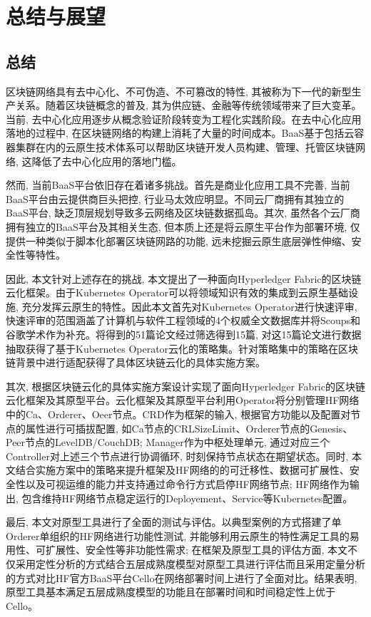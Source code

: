 \chapter{总结与展望}

\section{总结}

区块链网络具有去中心化、不可伪造、不可篡改的特性, 其被称为下一代的新型生产关系。随着区块链概念的普及, 其为供应链、金融等传统领域带来了巨大变革。当前, 去中心化应用逐步从概念验证阶段转变为工程化实践阶段。在去中心化应用落地的过程中, 在区块链网络的构建上消耗了大量的时间成本。BaaS基于包括云容器集群在内的云原生技术体系可以帮助区块链开发人员构建、管理、托管区块链网络, 这降低了去中心化应用的落地门槛。

然而, 当前BaaS平台依旧存在着诸多挑战。首先是商业化应用工具不完善, 当前BaaS平台由云提供商巨头把控, 行业马太效应明显。不同云厂商拥有其独立的BaaS平台, 缺乏顶层规划导致多云网络及区块链数据孤岛。其次, 虽然各个云厂商拥有独立的BaaS平台及其相关生态, 但本质上还是将云原生平台作为部署环境, 仅提供一种类似于脚本化部署区块链网路的功能, 远未挖掘云原生底层弹性伸缩、安全性等特性。

因此, 本文针对上述存在的挑战, 本文提出了一种面向Hyperledger Fabric的区块链云化框架。由于Kubernetes Operator可以将领域知识有效的集成到云原生基础设施, 充分发挥云原生的特性。因此本文首先对Kubernetes Operator进行快速评审, 快速评审的范围涵盖了计算机与软件工程领域的4个权威全文数据库并将Scoups和谷歌学术作为补充。将得到的51篇论文经过筛选得到15篇, 对这15篇论文进行数据抽取获得了基于Kubernetes Operator云化的策略集。针对策略集中的策略在区块链背景中进行适配获得了具体区块链云化的具体实施方案。

其次, 根据区块链云化的具体实施方案设计实现了面向Hyperledger Fabric的区块链云化框架及其原型平台。云化框架及其原型平台利用Operator将分别管理HF网络中的Ca、Orderer、Oeer节点。CRD作为框架的输入, 根据官方功能以及配置对节点的属性进行可插拔配置, 如Ca节点的CRLSizeLimit、Orderer节点的Genesis、Peer节点的LevelDB/CouchDB; Manager作为中枢处理单元, 通过对应三个Controller对上述三个节点进行协调循环, 时刻保持节点状态在期望状态。同时, 本文结合实施方案中的策略来提升框架及HF网络的的可迁移性、数据可扩展性、安全性以及可视运维的能力并支持通过命令行方式启停HF网络节点; HF网络作为输出, 包含维持HF网络节点稳定运行的Deployement、Service等Kubernetes配置。

最后, 本文对原型工具进行了全面的测试与评估。以典型案例的方式搭建了单Orderer单组织的HF网络进行功能性测试, 并能够利用云原生的特性满足工具的易用性、可扩展性、安全性等非功能性需求; 在框架及原型工具的评估方面, 本文不仅采用定性分析的方式结合五层成熟度模型对原型工具进行评估而且采用定量分析的方式对比HF官方BaaS平台Cello在网络部署时间上进行了全面对比。结果表明, 原型工具基本满足五层成熟度模型的功能且在部署时间和时间稳定性上优于Cello。


